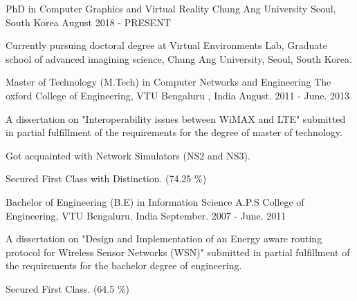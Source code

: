 

\begin{cventries}

  \cventry
    {PhD in Computer Graphics and Virtual Reality} %
    {Chung Ang University} %
    {Seoul, South Korea} %
    {August 2018 - PRESENT} %
    {
      \begin{cvitems} %
        \item {Currently pursuing doctoral degree at Virtual Environments Lab, Graduate school of advanced imagining science, Chung Ang University, Seoul, South Korea.}
      \end{cvitems}
    }

  \cventry
    {Master of Technology (M.Tech) in Computer Networks and Engineering} %
    {The oxford College of Engineering, VTU} %
    {Bengaluru , India} %
    {August. 2011 - June. 2013} %
    {
      \begin{cvitems} %
        \item {A dissertation on "Interoperability issues between WiMAX and LTE"  submitted in partial fulfillment of the requirements for the degree of master of technology.}
         \item {Got acquainted with Network Simulators (NS2 and NS3).}
        \item {Secured First Class with Distinction. (74.25 \%) }
      \end{cvitems}
    }

  \cventry
    {Bachelor of Engineering (B.E) in Information Science} %
    {A.P.S College of Engineering, VTU} %
    {Bengaluru, India} %
    {September. 2007 - June. 2011} %
    {
      \begin{cvitems} %
          \item {A dissertation on "Design and Implementation of an Energy aware routing protocol for Wireless Sensor Networks (WSN)" submitted in partial fulfillment of the requirements for the bachelor degree of engineering.}
        \item {Secured First Class. (64.5 \%)}
      \end{cvitems}
    }


\end{cventries}

